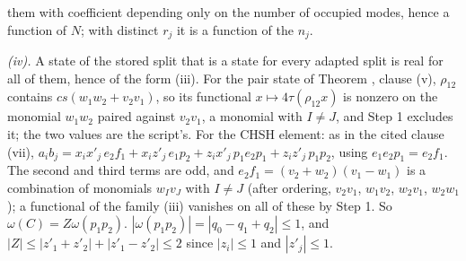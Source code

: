 them with coefficient depending only on the number of occupied modes, hence a function of $N$; with distinct $r_{j}$ it is a function of the $n_{j}$.

\emph{(iv).} A state of the stored split that is a state for every adapted split is real for all of them, hence of the form (iii). For the pair state of Theorem , clause (v), $\rho_{12}$ contains $cs(w_{1}w_{2} + v_{2}v_{1})$, so its functional $x \mapsto 4\tau(\rho_{12}x)$ is nonzero on the monomial $w_{1}w_{2}$ paired against $v_{2}v_{1}$, a monomial with $I \ne J$, and Step 1 excludes it; the two values are the script's. For the CHSH element: as in the cited clause (vii), $a_{i}b_{j} = x_{i}x'_{j}\,e_{2}f_{1} + x_{i}z'_{j}\,e_{1}p_{2} + z_{i}x'_{j}\,p_{1}e_{2}p_{1} + z_{i}z'_{j}\,p_{1}p_{2}$, using $e_{1}e_{2}p_{1} = e_{2}f_{1}$. The second and third terms are odd, and $e_{2}f_{1} = (v_{2} + w_{2})(v_{1} - w_{1})$ is a combination of monomials $w_{I}v_{J}$ with $I \ne J$ (after ordering, $v_{2}v_{1}$, $w_{1}v_{2}$, $w_{2}v_{1}$, $w_{2}w_{1}$); a functional of the family (iii) vanishes on all of these by Step 1. So $\omega(C) = Z\omega(p_{1}p_{2})$. $|\omega(p_{1}p_{2})| = |q_{0} - q_{1} + q_{2}| \le 1$, and $|Z| \le |z'_{1} + z'_{2}| + |z'_{1} - z'_{2}| \le 2$ since $|z_{i}| \le 1$ and $|z'_{j}| \le 1$.
